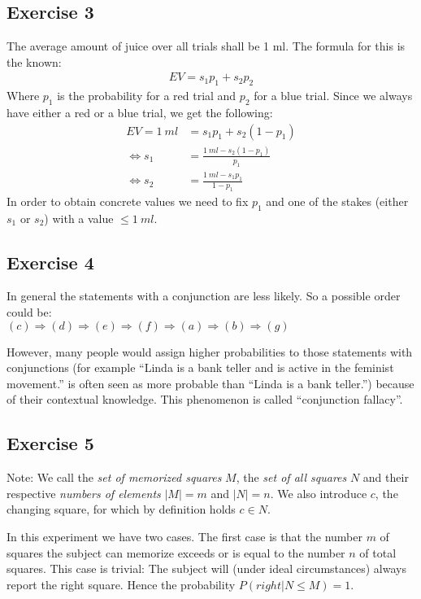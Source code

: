 \subsection*{Exercise 3}
The average amount of juice over all trials shall be 1 ml. The formula for this 
is the known:
\begin{align*}
EV = s_1 p_1 + s_2 p_2
\end{align*}
Where $p_1$ is the probability for a red trial and $p_2$ for a blue trial. 
Since we always have either a red or a blue trial, we get the following:
\begin{align*}
EV = 1 \  ml &= s_1 p_1 + s_2 (1 - p_1)\\
\Leftrightarrow s_1 &= \frac{1 \  ml - s_2 (1 - p_1)}{p_1}\\
\Leftrightarrow s_2 &= \frac{1 \  ml - s_1 p_1}{1 - p_1}
\end{align*}
In order to obtain concrete values we need to fix $p_1$ and one of the stakes 
(either $s_1$ or $s_2$) with a value $\leq 1 \  ml$.


\subsection*{Exercise 4}
In general the statements with a conjunction are less likely. So a possible order could be:\\
$(c)\Rightarrow(d)\Rightarrow(e)\Rightarrow(f)\Rightarrow(a)\Rightarrow(b)\Rightarrow(g)$

However, many people would assign higher probabilities to those statements with conjunctions (for example ``Linda is a bank teller and is active in the feminist movement.'' is often seen as more probable than ``Linda is a bank teller.'') because of their contextual knowledge. This phenomenon is called ``conjunction fallacy''.

\subsection*{Exercise 5}
{\footnotesize Note: We call the \textit{set of memorized squares} $M$, the 
\textit{set of all squares} $N$ and their respective \textit{numbers of elements} 
$|M| = m$ and $|N| = n$. We also introduce $c$, the changing square, for which 
by definition holds $c \in N$.}

In this experiment we have two cases. The first case is that the number $m$ of 
squares the subject can memorize exceeds or is equal to the number $n$ of total 
squares. This case is trivial: The subject will (under ideal circumstances) 
always report the right square. Hence the probability $P(right | N \leq M) = 1$.

